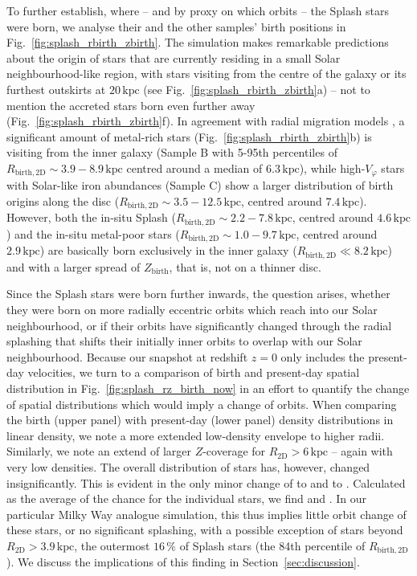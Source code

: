 \documentclass[fleqn,usenatbib]{mnras}
\begin{document}
To further establish, where -- and by proxy on which orbits -- the Splash stars were born, we analyse their and the other samples' birth positions in Fig.~\ref{fig:splash_rbirth_zbirth}. The simulation makes remarkable predictions about the origin of stars that are currently residing in a small Solar neighbourhood-like region, with stars visiting from the centre of the galaxy or its furthest outskirts at $20\,\mathrm{kpc}$ (see Fig.~\ref{fig:splash_rbirth_zbirth}a) -- not to mention the accreted stars born even further away (Fig.~\ref{fig:splash_rbirth_zbirth}f). In agreement with radial migration models \citep[for example][]{Frankel2018, Frankel2020}, a significant amount of metal-rich stars (Fig.~\ref{fig:splash_rbirth_zbirth}b) is visiting from the inner galaxy (Sample B with 5-95th percentiles of $R_\mathrm{birth, 2D} \sim 3.9 - 8.9\,\mathrm{kpc}$ centred around a median of $6.3\,\mathrm{kpc}$), while high-$V_\varphi$ stars with Solar-like iron abundances (Sample C) show a larger distribution of birth origins along the disc ($R_\mathrm{birth, 2D} \sim 3.5-12.5\,\mathrm{kpc}$, centred around $7.4\,\mathrm{kpc}$). However, both the in-situ Splash ($R_\mathrm{birth, 2D} \sim 2.2-7.8\,\mathrm{kpc}$, centred around $4.6\,\mathrm{kpc}$) and the in-situ metal-poor stars ($R_\mathrm{birth, 2D} \sim 1.0-9.7\,\mathrm{kpc}$, centred around $2.9\,\mathrm{kpc}$) are basically born exclusively in the inner galaxy ($R_\mathrm{birth, 2D} \ll 8.2\,\mathrm{kpc}$) and with a larger spread of $Z_\mathrm{birth}$, that is, not on a thinner disc.

Since the Splash stars were born further inwards, the question arises, whether they were born on more radially eccentric orbits which reach into our Solar neighbourhood, or if their orbits have significantly changed through the radial splashing that shifts their initially inner orbits to overlap with our Solar neighbourhood. Because our snapshot at redshift $z = 0$ only includes the present-day velocities, we turn to a comparison of birth and present-day spatial distribution in Fig.~\ref{fig:splash_rz_birth_now} in an effort to quantify the change of spatial distributions which would imply a change of orbits. When comparing the birth (upper panel) with present-day (lower panel) density distributions in linear density, we note a more extended low-density envelope to higher radii. Similarly, we note an extend of larger $Z$-coverage for $R_\mathrm{2D} > 6\,\mathrm{kpc}$ -- again with very low densities. The overall distribution of stars has, however, changed insignificantly. This is evident in the only minor change of  to  and  to . Calculated as the average of the chance for the individual stars, we find  and . In our particular Milky Way analogue simulation, this thus implies little orbit change of these stars, or no significant splashing, with a possible exception of stars beyond $R_\mathrm{2D} > 3.9\,\mathrm{kpc}$, the outermost $16\,\mathrm{\%}$ of Splash stars (the 84th percentile of $R_\mathrm{birth,2D}$). We discuss the implications of this finding in Section~\ref{sec:discussion}.
\end{document}
